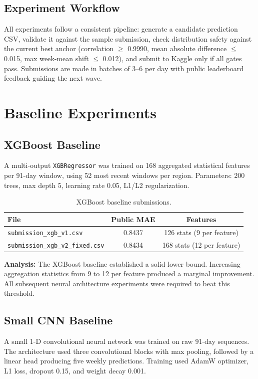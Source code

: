 \documentclass[12pt, a4paper]{article}
\begin{document}
\subsection{Experiment Workflow}
All experiments follow a consistent pipeline: generate a candidate prediction CSV, validate it against the sample submission, check distribution safety against the current best anchor (correlation $\ge$ 0.9990, mean absolute difference $\le$ 0.015, max week-mean shift $\le$ 0.012), and submit to Kaggle only if all gates pass. Submissions are made in batches of 3--6 per day with public leaderboard feedback guiding the next wave.

\section{Baseline Experiments}

\subsection{XGBoost Baseline}
A multi-output \texttt{XGBRegressor} was trained on 168 aggregated statistical features per 91-day window, using 52 most recent windows per region. Parameters: 200 trees, max depth 5, learning rate 0.05, L1/L2 regularization.

\begin{table}[H]
\centering
\caption{XGBoost baseline submissions.}
\label{tab:xgb}
\begin{tabular}{@{}lcc@{}}
\toprule
\textbf{File} & \textbf{Public MAE} & \textbf{Features} \\
\midrule
\texttt{submission\_xgb\_v1.csv}      & 0.8437 & 126 stats (9 per feature) \\
\texttt{submission\_xgb\_v2\_fixed.csv} & 0.8434 & 168 stats (12 per feature) \\
\bottomrule
\end{tabular}
\end{table}

\textbf{Analysis:} The XGBoost baseline established a solid lower bound. Increasing aggregation statistics from 9 to 12 per feature produced a marginal improvement. All subsequent neural architecture experiments were required to beat this threshold.

\subsection{Small CNN Baseline}
A small 1-D convolutional neural network was trained on raw 91-day sequences. The architecture used three convolutional blocks with max pooling, followed by a linear head producing five weekly predictions. Training used AdamW optimizer, L1 loss, dropout 0.15, and weight decay 0.001.
\end{document}
